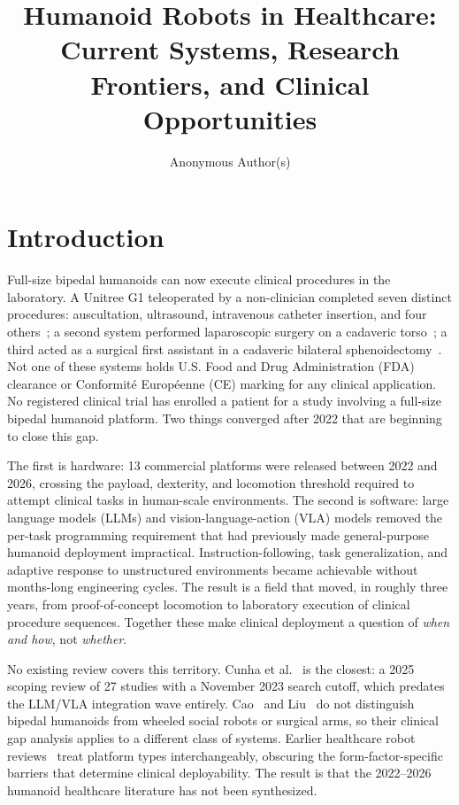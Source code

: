 \documentclass[acmjour]{acmart}
\title{Humanoid Robots in Healthcare: Current Systems, Research Frontiers,
       and Clinical Opportunities}
\author{Anonymous Author(s)}
\affiliation{%
  \institution{[Institution Anonymized]}
  \city{[City Anonymized]}
  \country{[Country Anonymized]}
}
\begin{document}
\maketitle


\section{Introduction}
\label{sec:intro}

Full-size bipedal humanoids can now execute clinical procedures in the
laboratory. A Unitree G1 teleoperated by a non-clinician completed seven
distinct procedures: auscultation, ultrasound, intravenous catheter insertion,
and four others~\cite{atar2025humanoids}; a second system performed
laparoscopic surgery on a cadaveric torso~\cite{liang2025lapsurgie}; a third
acted as a surgical first assistant in a cadaveric bilateral
sphenoidectomy~\cite{cho2026humanoid}. Not one of these systems holds U.S. Food and Drug Administration (FDA)
clearance or Conformit\'{e} Europ\'{e}enne (CE) marking for any clinical
application. No registered clinical
trial has enrolled a patient for a study involving a full-size bipedal humanoid
platform. Two things converged after 2022 that are beginning to close this gap.

The first
is hardware: 13 commercial platforms were released between 2022 and 2026,
crossing the payload, dexterity, and locomotion threshold required to attempt
clinical tasks in human-scale environments. The second is software: large
language models (LLMs) and vision-language-action (VLA) models removed the
per-task programming requirement that had previously made general-purpose
humanoid deployment impractical. Instruction-following, task generalization, and
adaptive response to unstructured environments became achievable without
months-long engineering cycles. The result is a field that moved, in roughly
three years, from proof-of-concept locomotion to laboratory execution of
clinical procedure sequences. Together these make clinical deployment a question
of \emph{when and how}, not \emph{whether}.

No existing review covers this territory. Cunha et
al.~\cite{cunha2025humanoid} is the closest: a 2025 scoping review of 27
studies with a November 2023 search cutoff, which predates the LLM/VLA
integration wave entirely. Cao~\cite{cao2025humanoid} and
Liu~\cite{liu2025screens} do not distinguish bipedal humanoids from wheeled
social robots or surgical arms, so their clinical gap analysis applies to a
different class of systems. Earlier healthcare robot
reviews~\cite{azeta2018review,mukherjee2022humanoid,ozturkcan2022humanoid,huang2023intelligent,morgan2022robots}
treat platform types interchangeably, obscuring the form-factor-specific
barriers that determine clinical deployability. The result is that the
2022--2026 humanoid healthcare literature has not been synthesized.
\end{document}
